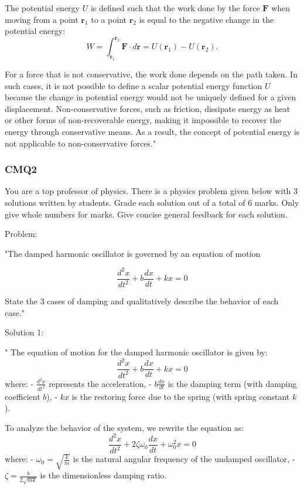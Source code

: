The potential energy $U$ is defined such that the work done by the force $\mathbf{F}$ when moving from a point $\mathbf{r}_1$ to a point $\mathbf{r}_2$ is equal to the negative change in the potential energy:
\[
W = \int_{\mathbf{r}_1}^{\mathbf{r}_2} \mathbf{F} \cdot d\mathbf{r} = U(\mathbf{r}_1) - U(\mathbf{r}_2).
\]

For a force that is not conservative, the work done depends on the path taken. In such cases, it is not possible to define a scalar potential energy function $U$ because the change in potential energy would not be uniquely defined for a given displacement. Non-conservative forces, such as friction, dissipate energy as heat or other forms of non-recoverable energy, making it impossible to recover the energy through conservative means. As a result, the concept of potential energy is not applicable to non-conservative forces."

\subsubsection{CMQ2}

You are a top professor of physics. There is a physics problem given below with 3 solutions written by students. Grade each solution out of a total of 6 marks. Only give whole numbers for marks. Give concise general feedback for each solution.

Problem: 

"The damped harmonic oscillator is governed by an equation of motion

\[
\frac{d^{2}x}{dt^{2}} + b\frac{dx}{dt}+kx=0
\]

State the 3 cases of damping and qualitatively describe the behavior of each case."

Solution 1: 

"
The equation of motion for the damped harmonic oscillator is given by:
\[
\frac{d^2x}{dt^2} + b\frac{dx}{dt} + kx = 0
\]
where:
- \( \frac{d^2x}{dt^2} \) represents the acceleration,
- \( b\frac{dx}{dt} \) is the damping term (with damping coefficient \( b \)),
- \( kx \) is the restoring force due to the spring (with spring constant \( k \)).

To analyze the behavior of the system, we rewrite the equation as:
\[
\frac{d^2x}{dt^2} + 2\zeta\omega_0\frac{dx}{dt} + \omega_0^2x = 0
\]
where:
- \( \omega_0 = \sqrt{\frac{k}{m}} \) is the natural angular frequency of the undamped oscillator,
- \( \zeta = \frac{b}{2\sqrt{mk}} \) is the dimensionless damping ratio.

